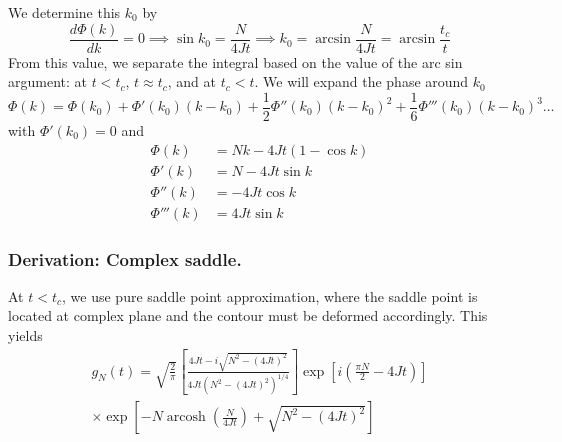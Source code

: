 \documentclass[../../../main.tex]{subfiles}
\begin{document}
We determine this $k_0$ by
\begin{equation*}
  \frac{d\Phi(k )}{dk} = 0 \implies
  \sin k_0 = \frac{N }{4Jt} \implies
  k_0 = \arcsin \frac{N }{4Jt} = \arcsin \frac{t_c }{t}
\end{equation*}
From this value, we separate the integral based on the value of the arc sin argument: at $t<t_c$, $t \approx t_c$, and at $t_c<t$.
We will expand the phase around $k_0$
\begin{equation*}
  \Phi (k )  =  \Phi(k_0) +  \Phi'(k_0)(k-k_0) + \frac{1}{2}\Phi''(k_0)(k-k_0)^2 + \frac{1 }{6 }\Phi'''(k_0)(k-k_0)^3\dots
\end{equation*}
with $\Phi'(k_0) = 0$ and
\begin{align*}
  \Phi(k)    & =  Nk - 4Jt (1  - \cos k) \\
  \Phi'(k)   & =  N -4Jt\sin k           \\
  \Phi''(k)  & = - 4Jt \cos k            \\
  \Phi'''(k) & = 4Jt \sin k
\end{align*}

\subsubsection{Derivation: Complex saddle.}
At $t<t_c$, we use pure saddle point approximation, where the saddle point is located at complex plane and the contour must be deformed accordingly.
This yields
\begin{multline*}
  g_N(t) = \sqrt{\frac{2}{\pi}} \left[ \frac{4Jt - i \sqrt{N^2 - (4Jt)^2}}{4Jt \left( N^2 - (4Jt)^2 \right)^{1/4}} \right]
  \exp\left[ i\left( \frac{\pi N}{2} - 4Jt \right) \right]\\
  \times \exp\left[ -N \operatorname{arcosh} \left(\frac{N}{4Jt}\right) + \sqrt{N^2 - (4Jt)^2} \right]
\end{multline*}
\end{document}
